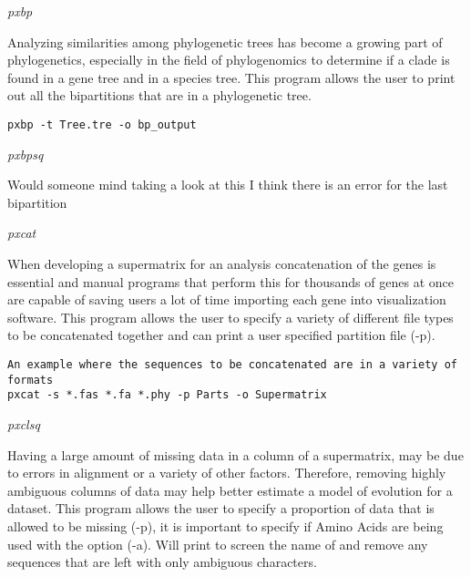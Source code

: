 \documentclass[12pt,letterpaper]{article}
\renewcommand{\subsection}[1]{%
\bigskip
\begin{center}
\begin{large}
\normalfont\itshape #1
\end{large}
\end{center}}
\begin{document}
\subsection{pxbp}

Analyzing similarities among phylogenetic trees has become a growing part of phylogenetics, especially in the field of phylogenomics to determine if a clade is found in a gene tree and in a species tree. This program allows the user to print out all the bipartitions that are in a phylogenetic tree.

\begin{flushleft}
\begin{verbatim}
pxbp -t Tree.tre -o bp_output
\end{verbatim}
\end{flushleft}


\subsection{pxbpsq}

Would someone mind taking a look at this I think there is an error for the last bipartition

\subsection{pxcat}

When developing a supermatrix for an analysis concatenation of the genes is essential and manual programs that perform this for thousands of genes at once are capable of saving users a lot of time importing each gene into visualization software. This program allows the user to specify a variety of different file types to be concatenated together and can print a user specified partition file (-p).

\begin{flushleft}
\begin{verbatim}
An example where the sequences to be concatenated are in a variety of formats
pxcat -s *.fas *.fa *.phy -p Parts -o Supermatrix
\end{verbatim}
\end{flushleft}

\subsection{pxclsq}

Having a large amount of missing data in a column of a supermatrix, may be due to errors in alignment or a variety of other factors. Therefore, removing highly ambiguous columns of data may help better estimate a model of evolution for a dataset. This program allows the user to specify a proportion of data that is allowed to be missing (-p), it is important to specify if Amino Acids are being used with the option (-a). Will print to screen the name of and remove any sequences that are left with only ambiguous characters.
\end{document}
